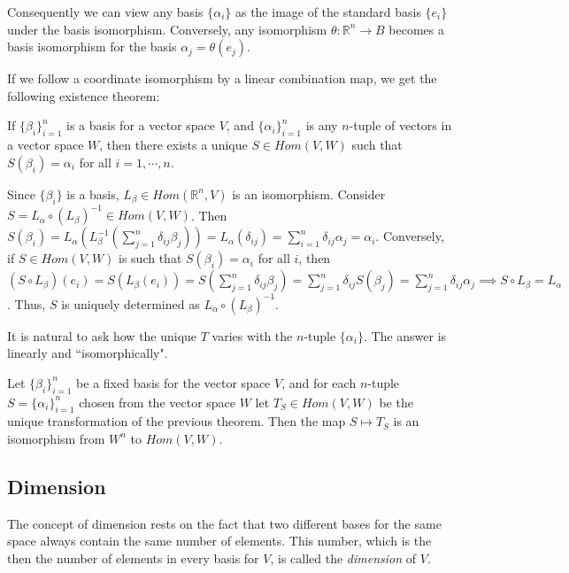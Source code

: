 \documentclass[12pt,letterpaper,reqno]{article}
\numberwithin{equation}{section}
\newcommand{\ti}[1]{\textit{#1}}
\newcommand{\fixme}[1]{{\color{orange}{[#1]}}}
\begin{document}
Consequently we can view any basis $\{\alpha_i\}$ as the image of the standard basis $\{e_i\}$ under the basis isomorphism. Conversely, any isomorphism $\theta:\mathbb{R}^n \to B$ becomes a basis isomorphism for the basis $\alpha_j=\theta(e_j)$.


\fixme{Do we need the next two theorems?}

If we follow a coordinate isomorphism by a linear combination map, we get the following existence theorem:

\begin{thm}\label{thm:linear_maps_of_basis_vectors}
If $\{\beta_i\}_{i=1}^n$ is a basis for a vector space $V$, and $\{\alpha_i\}_{i=1}^n$ is any $n$-tuple of vectors in a vector space $W$, then there exists a unique $S \in Hom(V,W)$ such that $S(\beta_i)=\alpha_i$ for all $i=1,\cdots,n$.	
\end{thm}

\begin{pf}
Since $\{\beta_i\}$ is a basis, $L_\beta \in Hom(\mathbb{R}^n,V)$ is an isomorphism. Consider $S=L_\alpha \circ (L_\beta)^{-1} \in Hom(V,W)$. Then $S(\beta_i)=L_\alpha( L_{\beta}^{-1}(\sum_{j=1}^n\delta_{ij}\beta_j))=L_\alpha(\delta_{ij})=\sum_{i=1}^n\delta_{ij}\alpha_j=\alpha_i$. Conversely, if $S \in Hom(V,W)$ is such that $S(\beta_i)=\alpha_i$ for all $i$, then $(S \circ L_\beta)(e_i)=S(L_\beta(e_i))=S(\sum_{j=1}^n\delta_{ij}\beta_j)=\sum_{j=1}^n\delta_{ij}S(\beta_j)=\sum_{j=1}^n\delta_{ij}\alpha_j \implies S \circ L_\beta=L_\alpha$. Thus, $S$ is uniquely determined as $L_\alpha \circ (L_\beta)^{-1}$.	
\end{pf}

It is natural to ask how the unique $T$ varies with the $n$-tuple $\{\alpha_i\}$. The answer is linearly and ``isomorphically".

\begin{thm}
Let $\{\beta_i\}_{i=1}^n$ be a fixed basis for the vector space $V$, and for each $n$-tuple $S=\{\alpha_i\}_{i=1}^n$ chosen from the vector space $W$ let $T_S \in Hom(V,W)$ be the unique transformation of the previous theorem. Then the map $S \mapsto T_S$ is an isomorphism from $W^n$ to $Hom(V,W)$.	
\end{thm}

\subsection{Dimension}
The concept of dimension rests on the fact that two different bases for the same space always contain the same number of elements. This number, which is the then the number of elements in every basis for $V$, is called the \ti{dimension} of $V$. 
\end{document}
